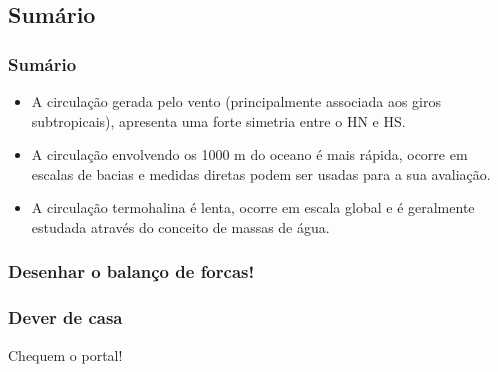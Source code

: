 \subsection{Sumário}
\begin{frame}
\frametitle{Sumário}
  \begin{itemize}[<+-| alert@+>]
    \item A circulação gerada pelo vento (principalmente associada aos giros
          subtropicais), apresenta uma forte simetria entre o HN e HS.
    \item A circulação envolvendo os 1000 m do oceano é mais rápida, ocorre em
          escalas de bacias e medidas diretas podem ser usadas para a sua
          avaliação.
    \item A circulação termohalina é lenta, ocorre em escala global e é
          geralmente estudada através do conceito de massas de água.
  \end{itemize}
\end{frame}


\begin{frame}
  \frametitle{Desenhar o balanço de forcas!}
\end{frame}

\begin{frame}
  \frametitle{Dever de casa}
  \pause
    Chequem o portal!
\end{frame}


